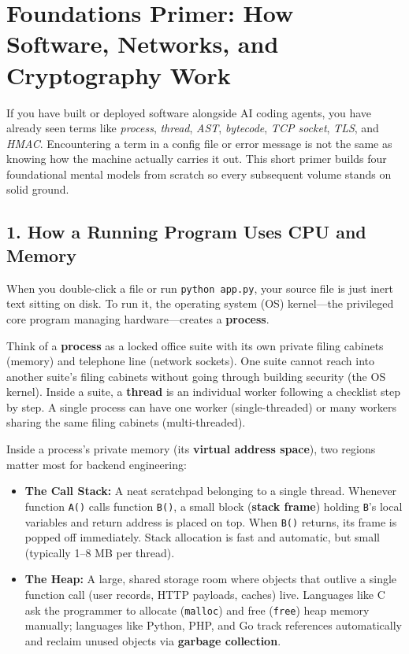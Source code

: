 \chapter*{Foundations Primer: How Software, Networks, and Cryptography Work}
\label{chap:foundations-primer}

If you have built or deployed software alongside AI coding agents, you have already seen terms like \emph{process}, \emph{thread}, \emph{AST}, \emph{bytecode}, \emph{TCP socket}, \emph{TLS}, and \emph{HMAC}. Encountering a term in a config file or error message is not the same as knowing how the machine actually carries it out. This short primer builds four foundational mental models from scratch so every subsequent volume stands on solid ground.

\section*{1. How a Running Program Uses CPU and Memory}
\label{sec:primer-os}

When you double-click a file or run \texttt{python app.py}, your source file is just inert text sitting on disk. To run it, the operating system (OS) kernel---the privileged core program managing hardware---creates a \textbf{process}.

\begin{intuitionbox}
Think of a \textbf{process} as a locked office suite with its own private filing cabinets (memory) and telephone line (network sockets). One suite cannot reach into another suite's filing cabinets without going through building security (the OS kernel). Inside a suite, a \textbf{thread} is an individual worker following a checklist step by step. A single process can have one worker (single-threaded) or many workers sharing the same filing cabinets (multi-threaded).
\end{intuitionbox}

Inside a process's private memory (its \textbf{virtual address space}), two regions matter most for backend engineering:
\begin{itemize}[leftmargin=15pt]
  \item \textbf{The Call Stack:} A neat scratchpad belonging to a single thread. Whenever function \texttt{A()} calls function \texttt{B()}, a small block (\textbf{stack frame}) holding \texttt{B}'s local variables and return address is placed on top. When \texttt{B()} returns, its frame is popped off immediately. Stack allocation is fast and automatic, but small (typically 1--8 MB per thread).
  \item \textbf{The Heap:} A large, shared storage room where objects that outlive a single function call (user records, HTTP payloads, caches) live. Languages like C ask the programmer to allocate (\texttt{malloc}) and free (\texttt{free}) heap memory manually; languages like Python, PHP, and Go track references automatically and reclaim unused objects via \textbf{garbage collection}.
\end{itemize}

